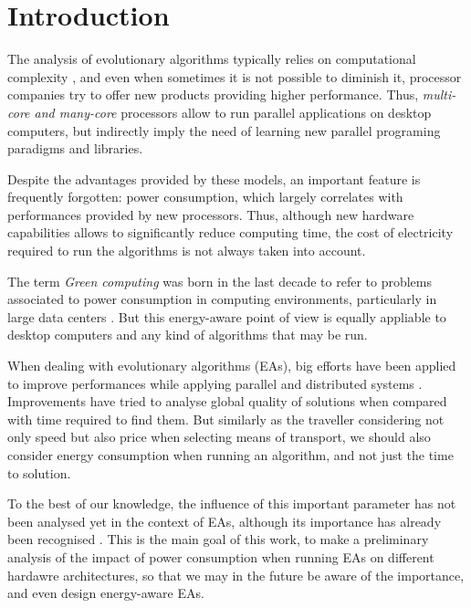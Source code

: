 \section{Introduction}

The analysis of evolutionary algorithms typically relies on computational complexity \cite{complexity}, %
 and even when sometimes it is not possible to diminish it, processor companies try to offer new products providing higher performance.  Thus, \textit{multi-core and many-core} processors allow to run parallel applications on desktop computers, but indirectly imply the need of learning new parallel programing paradigms and libraries. %

Despite the advantages provided by these models, an important feature
is frequently forgotten:  power consumption, which largely correlates
with performances provided by new processors.  Thus, although new
hardware capabilities allows to significantly reduce computing time,
the cost of electricity required to run the algorithms is not always
taken into account.%

The term \textit{Green computing} was born in the last decade to refer
to problems associated to power consumption in computing environments,
particularly in large data centers \cite{green-computing}.  But this
energy-aware point of view is equally appliable to desktop computers
and any kind of algorithms that may be run. 

When dealing with evolutionary algorithms (EAs), big efforts have been applied to improve performances while applying parallel and distributed systems \cite{paba}.  Improvements have tried to analyse global quality of solutions when compared with time required to find them.  But similarly as the traveller considering not only speed but also price when selecting means of transport, we should also consider energy consumption when running an algorithm, and not just the time to solution.

To the best of our knowledge, the influence of this important parameter has not been analysed yet in the context of EAs, although its importance has already been recognised \cite{ephemeral}.  This is the main goal of this work, to make a preliminary analysis of the impact of power consumption when running EAs on different hardawre architectures, so that we may in the future be aware of the importance, and even design energy-aware EAs.
